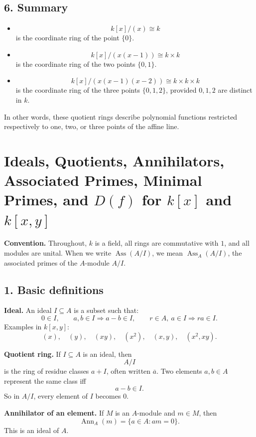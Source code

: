 \documentclass[12pt,a4paper]{article}
\theoremstyle{notespace}
\DeclareMathOperator{\Ass}{Ass}
\DeclareMathOperator{\Ann}{Ann}
\begin{document}
\subsection*{6. Summary}

\begin{itemize}
	\item
	\[
	k[x]/(x)\cong k
	\]
	is the coordinate ring of the point \(\{0\}\).
	
	\item
	\[
	k[x]/(x(x-1))\cong k\times k
	\]
	is the coordinate ring of the two points \(\{0,1\}\).
	
	\item
	\[
	k[x]/(x(x-1)(x-2))\cong k\times k\times k
	\]
	is the coordinate ring of the three points \(\{0,1,2\}\), provided \(0,1,2\) are distinct in \(k\).
\end{itemize}

In other words, these quotient rings describe polynomial functions restricted respectively to one, two, or three points of the affine line.

\section*{Ideals, Quotients, Annihilators, Associated Primes, Minimal Primes, and \(D(f)\) for \(k[x]\) and \(k[x,y]\)}

\textbf{Convention.}
Throughout, \(k\) is a field, all rings are commutative with \(1\), and all modules are unital.
When we write \(\Ass(A/I)\), we mean \(\Ass_A(A/I)\), the associated primes of the \(A\)-module \(A/I\).

\subsection*{1. Basic definitions}

\textbf{Ideal.}
An ideal \(I\subseteq A\) is a subset such that:
\[
0\in I,\qquad a,b\in I \Rightarrow a-b\in I,\qquad r\in A,\ a\in I \Rightarrow ra\in I.
\]
Examples in \(k[x,y]\):
\[
(x),\quad (y),\quad (xy),\quad (x^2),\quad (x,y),\quad (x^2,xy).
\]

\textbf{Quotient ring.}
If \(I\subseteq A\) is an ideal, then
\[
A/I
\]
is the ring of residue classes \(a+I\), often written \(\overline a\).
Two elements \(a,b\in A\) represent the same class iff
\[
a-b\in I.
\]
So in \(A/I\), every element of \(I\) becomes \(0\).

\textbf{Annihilator of an element.}
If \(M\) is an \(A\)-module and \(m\in M\), then
\[
\Ann_A(m)=\{a\in A:am=0\}.
\]
This is an ideal of \(A\).
\end{document}
